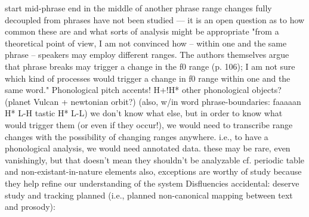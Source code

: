 \markdownRendererUlEndTight \markdownRendererUlItemEnd 
\markdownRendererUlItem start mid-phrase end in the middle of another phrase\markdownRendererInterblockSeparator
{}\markdownRendererUlBeginTight
\markdownRendererUlItem range changes fully decoupled from phrases\markdownRendererUlItemEnd 
\markdownRendererUlItem have not been studied — it is an open question as to how common these are and what sorts of analysis might be appropriate\markdownRendererUlItemEnd 
\markdownRendererUlEndTight \markdownRendererUlItemEnd 
\markdownRendererUlEndTight \markdownRendererUlItemEnd 
\markdownRendererUlEndTight \markdownRendererUlItemEnd 
\markdownRendererUlItem "from a theoretical point of view, I am not convinced how – within one and the same phrase – speakers may employ different ranges. The authors themselves argue that phrase breaks may trigger a change in the f0 range (p. 106); I am not sure which kind of processes would trigger a change in f0 range within one and the same word."\markdownRendererInterblockSeparator
{}\markdownRendererUlBeginTight
\markdownRendererUlItem Phonological\markdownRendererInterblockSeparator
{}\markdownRendererUlBeginTight
\markdownRendererUlItem pitch accents! H+!H*\markdownRendererUlItemEnd 
\markdownRendererUlItem other phonological objects? (planet Vulcan + newtonian orbit?)\markdownRendererUlItemEnd 
\markdownRendererUlItem (also, w/in word phrase-boundaries: faaaaan H* L-H\markdownRendererPercentSign{} tastic H* L-L\markdownRendererPercentSign{})\markdownRendererUlItemEnd 
\markdownRendererUlItem we don't know what else, but in order to know what would trigger them (or even if they occur!), we would need to transcribe range changes with the possibility of changing ranges anywhere. i.e., to have a phonological analysis, we would need annotated data.\markdownRendererUlItemEnd 
\markdownRendererUlItem these may be rare, even vanishingly, but that doesn’t mean they shouldn’t be analyzable\markdownRendererInterblockSeparator
{}\markdownRendererUlBeginTight
\markdownRendererUlItem cf. periodic table and non-existant-in-nature elements\markdownRendererUlItemEnd 
\markdownRendererUlItem also, exceptions are worthy of study because they help refine our understanding of the system\markdownRendererUlItemEnd 
\markdownRendererUlEndTight \markdownRendererUlItemEnd 
\markdownRendererUlEndTight \markdownRendererUlItemEnd 
\markdownRendererUlItem Disfluencies\markdownRendererInterblockSeparator
{}\markdownRendererUlBeginTight
\markdownRendererUlItem accidental: deserve study and tracking\markdownRendererUlItemEnd 
\markdownRendererUlItem planned (i.e., planned non-canonical mapping between text and prosody):\markdownRendererSoftLineBreak
